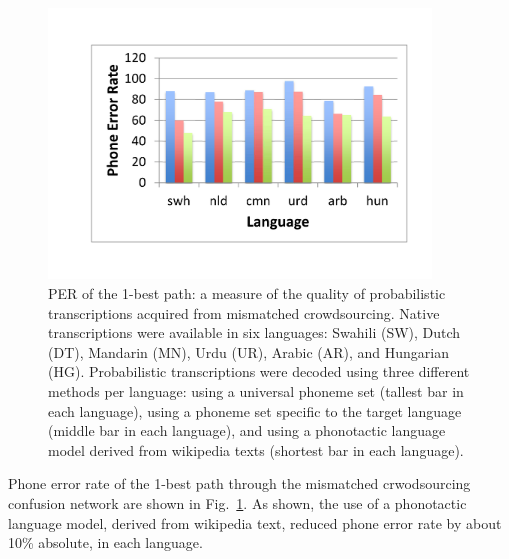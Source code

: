 \begin{figure}
  \centerline{\includegraphics[width=4in]{../figs/lm_results.pdf}}
  \caption{PER of the 1-best path: a measure of the quality of
    probabilistic transcriptions acquired from mismatched
    crowdsourcing.  Native transcriptions were available in six
    languages: Swahili (SW), Dutch (DT), Mandarin (MN), Urdu (UR),
    Arabic (AR), and Hungarian (HG).  Probabilistic transcriptions
    were decoded using three different methods per language: using a
    universal phoneme set (tallest bar in each language), using a
    phoneme set specific to the target language (middle bar in each
    language), and using a phonotactic language model derived from
    wikipedia texts (shortest bar in each language).}
  \label{fig:pt_decode_per}
\end{figure}

Phone error rate of the 1-best path through the mismatched
crwodsourcing confusion network are shown in
Fig.~\ref{fig:pt_decode_per}.  As shown, the use of a phonotactic
language model, derived from wikipedia text, reduced phone error rate
by about 10\% absolute, in each language.

